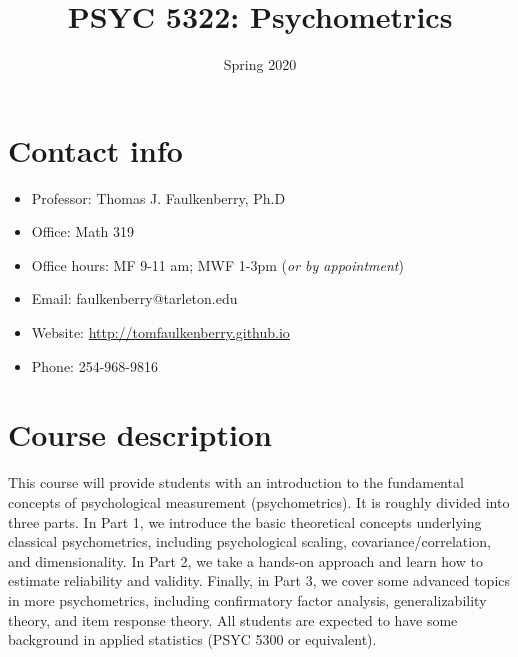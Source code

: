 \documentclass[10pt]{article}
\date{Spring 2020}
\title{PSYC 5322: Psychometrics}
\begin{document}
\maketitle

\section*{Contact info}
\label{sec:org42ff4ba}
\begin{itemize}
\item Professor: Thomas J. Faulkenberry, Ph.D
\item Office: Math 319
\item Office hours: MF 9-11 am; MWF 1-3pm (\emph{or by appointment})
\item Email: faulkenberry@tarleton.edu
\item Website: \url{http://tomfaulkenberry.github.io}
\item Phone: 254-968-9816
\end{itemize}

\section*{Course description}
\label{sec:orgafbc962}

This course will provide students with an introduction to the fundamental concepts of psychological measurement (psychometrics). It is roughly divided into three parts. In Part 1, we introduce the basic theoretical concepts underlying classical psychometrics, including psychological scaling, covariance/correlation, and dimensionality. In Part 2, we take a hands-on approach and learn how to estimate reliability and validity. Finally, in Part 3, we cover some advanced topics in more psychometrics, including confirmatory factor analysis, generalizability theory, and item response theory. All students are expected to have some background in applied statistics (PSYC 5300 or equivalent). 
\end{document}
